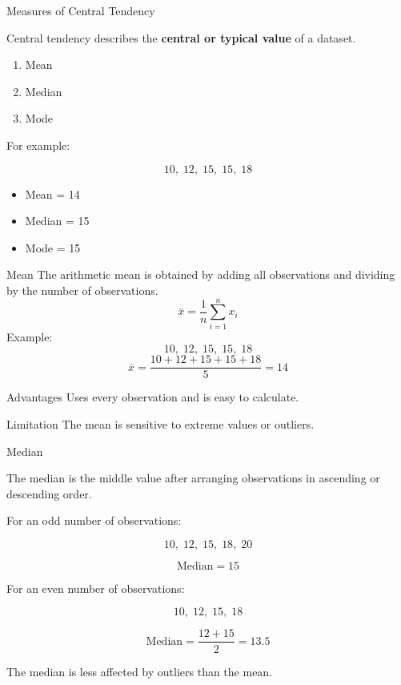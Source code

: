 \documentclass[aspectratio=169]{beamer}
\begin{document}
\begin{frame}{Measures of Central Tendency}

Central tendency describes the \textbf{central or typical value}
of a dataset.

\begin{enumerate}
    \item Mean
    \item Median
    \item Mode
\end{enumerate}

\vspace{0.3cm}

For example:

\[
10,\;12,\;15,\;15,\;18
\]

\begin{itemize}
    \item Mean = 14
    \item Median = 15
    \item Mode = 15
\end{itemize}
\end{frame}

\begin{frame}{Mean}
The arithmetic mean is obtained by adding all observations and
dividing by the number of observations.
\[
\boxed{
\bar{x}=\frac{1}{n}\sum_{i=1}^{n}x_i
}
\]
Example:
\[
10,\;12,\;15,\;15,\;18
\]
\[
\bar{x}
=
\frac{10+12+15+15+18}{5}
=
14
\]
\begin{block}{Advantages}
Uses every observation and is easy to calculate.
\end{block}
\begin{alertblock}{Limitation}
The mean is sensitive to extreme values or outliers.
\end{alertblock}
\end{frame}

\begin{frame}{Median}

The median is the middle value after arranging observations
in ascending or descending order.

For an odd number of observations:

\[
10,\;12,\;15,\;18,\;20
\]

\[
\boxed{\text{Median}=15}
\]

For an even number of observations:

\[
10,\;12,\;15,\;18
\]

\[
\text{Median}
=
\frac{12+15}{2}
=
13.5
\]

The median is less affected by outliers than the mean.
\end{frame}
\end{document}
